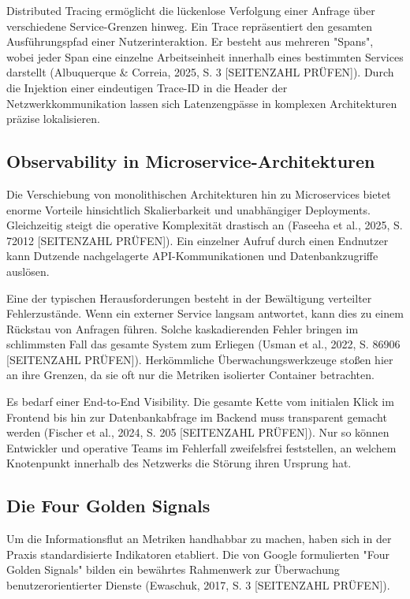 Distributed Tracing ermöglicht die lückenlose Verfolgung einer Anfrage über verschiedene Service-Grenzen hinweg. Ein Trace repräsentiert den gesamten Ausführungspfad einer Nutzerinteraktion. Er besteht aus mehreren "Spans", wobei jeder Span eine einzelne Arbeitseinheit innerhalb eines bestimmten Services darstellt (Albuquerque \& Correia, 2025, S. 3 [SEITENZAHL PRÜFEN]). Durch die Injektion einer eindeutigen Trace-ID in die Header der Netzwerkkommunikation lassen sich Latenzengpässe in komplexen Architekturen präzise lokalisieren.

\subsection{Observability in Microservice-Architekturen}

Die Verschiebung von monolithischen Architekturen hin zu Microservices bietet enorme Vorteile hinsichtlich Skalierbarkeit und unabhängiger Deployments. Gleichzeitig steigt die operative Komplexität drastisch an (Faseeha et al., 2025, S. 72012 [SEITENZAHL PRÜFEN]). Ein einzelner Aufruf durch einen Endnutzer kann Dutzende nachgelagerte API-Kommunikationen und Datenbankzugriffe auslösen.

Eine der typischen Herausforderungen besteht in der Bewältigung verteilter Fehlerzustände. Wenn ein externer Service langsam antwortet, kann dies zu einem Rückstau von Anfragen führen. Solche kaskadierenden Fehler bringen im schlimmsten Fall das gesamte System zum Erliegen (Usman et al., 2022, S. 86906 [SEITENZAHL PRÜFEN]). Herkömmliche Überwachungswerkzeuge stoßen hier an ihre Grenzen, da sie oft nur die Metriken isolierter Container betrachten.

Es bedarf einer End-to-End Visibility. Die gesamte Kette vom initialen Klick im Frontend bis hin zur Datenbankabfrage im Backend muss transparent gemacht werden (Fischer et al., 2024, S. 205 [SEITENZAHL PRÜFEN]). Nur so können Entwickler und operative Teams im Fehlerfall zweifelsfrei feststellen, an welchem Knotenpunkt innerhalb des Netzwerks die Störung ihren Ursprung hat.

\subsection{Die Four Golden Signals}

Um die Informationsflut an Metriken handhabbar zu machen, haben sich in der Praxis standardisierte Indikatoren etabliert. Die von Google formulierten "Four Golden Signals" bilden ein bewährtes Rahmenwerk zur Überwachung benutzerorientierter Dienste (Ewaschuk, 2017, S. 3 [SEITENZAHL PRÜFEN]).

